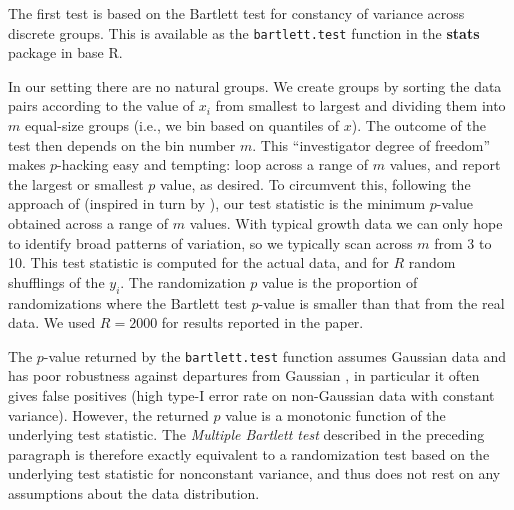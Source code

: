 \documentclass[12pt]{article}
\begin{document}
The first test is based on the Bartlett test for constancy of variance across discrete groups. This is  
available as the \texttt{bartlett.test} function in the \textbf{stats} package in base R. 

In our setting there are no natural groups. We create groups by sorting the data pairs according to the value of $x_i$ from smallest to largest 
and dividing them into $m$ equal-size groups (i.e., we bin based on quantiles of $x$). 
The outcome of the test then depends on the bin number $m$. This ``investigator degree of freedom'' makes $p$-hacking easy and tempting: 
loop across a range of $m$ values, and report the largest or smallest $p$ value, as desired. To circumvent this, following 
the approach of \citet{ye-Jensen-2020} (inspired in turn by \cite{sizer-99}), our test statistic is the minimum $p$-value obtained across a range of $m$ values.  
With typical growth data we can only hope to identify broad patterns of variation, so we typically scan across $m$ from 3 to 10. 
This test statistic is computed for the actual data, and for $R$ random shufflings of the $y_i$. The randomization $p$ value is the proportion of 
randomizations where the Bartlett test $p$-value is smaller than that from the real data. We used $R=2000$ for results reported in the paper.  

The $p$-value returned by the \texttt{bartlett.test} function assumes Gaussian data and has poor robustness against departures from Gaussian \citep{conover-etal-1981}, 
in particular it often gives false positives (high type-I error rate on non-Gaussian data with constant variance).  
However, the returned $p$ value is a monotonic function of the underlying test statistic. The \emph{Multiple Bartlett test} described in the preceding paragraph is therefore 
exactly equivalent to a randomization test based on the underlying test statistic for nonconstant variance, and thus does not rest on any assumptions about the data distribution. 
\end{document}
